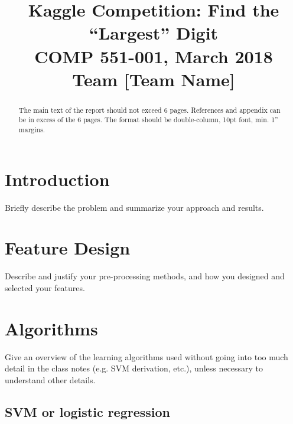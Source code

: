 \documentclass[conference]{IEEEtran}
\begin{document}
\title{Kaggle Competition: Find the ``Largest'' Digit\\
{\large COMP 551-001, March 2018\\}
{\Large Team [Team Name]}
}

\author{
\and
{}
\and
{}
}

\maketitle

\begin{abstract}
The main text of the report should not exceed 6 pages. References and appendix can be in excess of the 6 pages. The format should be double-column, 10pt font, min. 1” margins.
\end{abstract}

\section{Introduction}

Briefly describe the problem and summarize your approach and results.


\section{Feature Design}

Describe and justify your pre-processing methods, and how you designed and selected your features.

\section{Algorithms}

Give an overview of the learning algorithms used without going into too much detail in the class notes (e.g. SVM derivation, etc.), unless necessary to understand other details.

\subsection{SVM or logistic regression}
\end{document}
